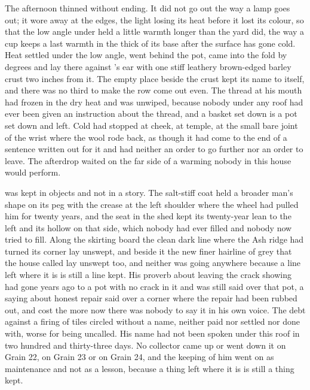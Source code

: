The afternoon thinned without ending. It did not go out the way a lamp goes out; it wore away at the edges, the light losing its heat before it lost its colour, so that the low angle under  held a little warmth longer than the yard did, the way a cup keeps a last warmth in the thick of its base after the surface has gone cold. Heat settled under the low angle, went behind the pot, came into the fold by degrees and lay there against 's ear with one stiff leathery brown-edged barley crust two inches from it. The empty place beside the crust kept its name to itself, and there was no third to make the row come out even. The thread at his mouth had frozen in the dry heat and was unwiped, because nobody under any roof had ever been given an instruction about the thread, and a basket set down is a pot set down and left. Cold had stopped at cheek, at temple, at the small bare joint of the wrist where the wool rode back, as though it had come to the end of a sentence written out for it and had neither an order to go further nor an order to leave. The afterdrop waited on the far side of a warming nobody in this house would perform.

 was kept in objects and not in a story. The salt-stiff coat held a broader man's shape on its peg with the crease at the left shoulder where the wheel had pulled him for twenty years, and the seat in the shed kept its twenty-year lean to the left and its hollow on that side, which nobody had ever filled and nobody now tried to fill. Along the skirting board the clean dark line where the Ash ridge had turned its corner lay unswept, and beside it the new finer hairline of grey that the house called  lay unswept too, and neither was going anywhere because a line left where it is is still a line kept. His proverb about leaving the crack showing had gone years ago to a pot with no crack in it and was still said over that pot, a saying about honest repair said over a corner where the repair had been rubbed out, and cost the more now there was nobody to say it in his own voice. The debt against a firing of tiles circled without a name, neither paid nor settled nor done with, worse for being uncalled. His name had not been spoken under this roof in two hundred and thirty-three days. No collector came up  or went down it on Grain 22, on Grain 23 or on Grain 24, and the keeping of him went on as maintenance and not as a lesson, because a thing left where it is is still a thing kept.

